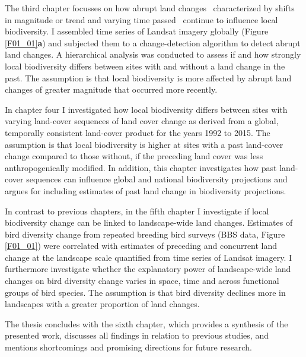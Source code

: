 The third chapter focusses on how abrupt land changes \textendash\ characterized by shifts in magnitude or trend and varying time passed \textendash\ continue to influence local biodiversity. I assembled time series of Landsat imagery globally (Figure \ref{F01_01}\textbf{a}) and subjected them to a change-detection algorithm to detect abrupt land changes. A hierarchical analysis was conducted to assess if and how strongly local biodiversity differs between sites with and without a land change in the past. The assumption is that local biodiversity is more affected by abrupt land changes of greater magnitude that occurred more recently.

In chapter four I investigated how local biodiversity differs between sites with varying land-cover sequences of land cover change as derived from a global, temporally consistent land-cover product for the years 1992 to 2015. The assumption is that local biodiversity is higher at sites with a past land-cover change compared to those without, if the preceding land cover was less anthropogenically modified. In addition, this chapter investigates how past land-cover sequences can influence global and national biodiversity projections and argues for including estimates of past land change in biodiversity projections.

In contrast to previous chapters, in the fifth chapter I investigate if local biodiversity change can be linked to landscape-wide land changes. Estimates of bird diversity change from repeated breeding bird surveys (BBS data, Figure \ref{F01_01}) were correlated with estimates of preceding and concurrent land change at the landscape scale quantified from time series of Landsat imagery. I furthermore investigate whether the explanatory power of landscape-wide land changes on bird diversity change varies in space, time and across functional groups of bird species. The assumption is that bird diversity declines more in landscapes with a greater proportion of land changes.

The thesis concludes with the sixth chapter, which provides a synthesis of the presented work, discusses all findings in relation to previous studies, and mentions shortcomings and promising directions for future research.

\clearpage
%

%  
